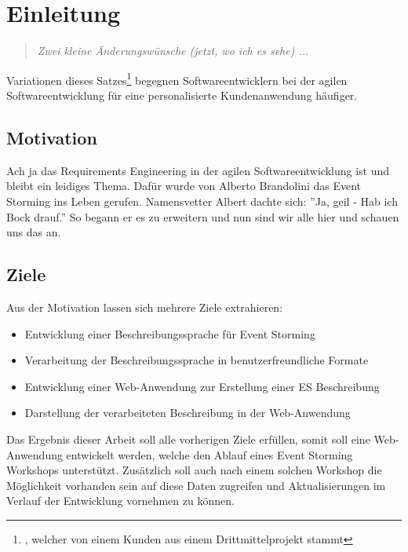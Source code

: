 \chapter{Einleitung}\label{ch:einleitung}

\begin{quote}
    \textit{Zwei kleine Änderungswünsche (jetzt, wo ich es sehe) ...}
\end{quote}


Variationen dieses Satzes\footnote{, welcher von einem Kunden aus einem Drittmittelprojekt stammt}
begegnen Softwareentwicklern bei der agilen Softwareentwicklung für eine personalisierte Kundenanwendung häufiger.


\section{Motivation}\label{sec:motivation}

Ach ja das Requirements Engineering in der agilen Softwareentwicklung ist
und bleibt ein leidiges Thema.
Dafür wurde von Alberto Brandolini das Event Storming ins Leben gerufen.
Namensvetter Albert dachte sich: ''Ja, geil - Hab ich Bock drauf.''
So begann er es zu erweitern und nun sind wir alle hier und schauen uns das an.


\section{Ziele}\label{sec:ziele}
Aus der Motivation lassen sich mehrere Ziele extrahieren:

\begin{itemize}
    \item Entwicklung einer Beschreibungssprache für Event Storming
    \item Verarbeitung der Beschreibungssprache in benutzerfreundliche Formate
    \item Entwicklung einer Web-Anwendung zur Erstellung einer \ac{ES} Beschreibung
    \item Darstellung der verarbeiteten Beschreibung in der Web-Anwendung
\end{itemize}

Das Ergebnis dieser Arbeit soll alle vorherigen Ziele erfüllen, somit soll eine Web-Anwendung entwickelt werden,
welche den Ablauf eines Event Storming Workshops unterstützt.
Zusätzlich soll auch nach einem solchen Workshop die Möglichkeit vorhanden sein auf diese Daten zugreifen und Aktualisierungen
im Verlauf der Entwicklung vornehmen zu können.


